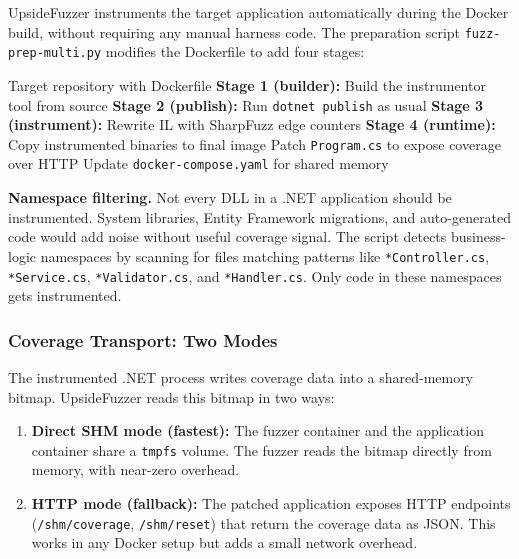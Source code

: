 \documentclass[conference]{IEEEtran}
\begin{document}
UpsideFuzzer instruments the target application automatically during the Docker build, without requiring any manual harness code. The preparation script \texttt{fuzz-prep-multi.py} modifies the Dockerfile to add four stages:

\begin{algorithm}[t]
\caption{Automated Instrumentation Pipeline}
\label{alg:instrument}
\begin{algorithmic}[1]
\REQUIRE Target repository with Dockerfile
\STATE \textbf{Stage 1 (builder):} Build the instrumentor tool from source
\STATE \textbf{Stage 2 (publish):} Run \texttt{dotnet publish} as usual
\STATE \textbf{Stage 3 (instrument):}
        \STATE Rewrite IL with SharpFuzz edge counters
    \ENDIF
\ENDFOR
\STATE \textbf{Stage 4 (runtime):} Copy instrumented binaries to final image
\STATE Patch \texttt{Program.cs} to expose coverage over HTTP
\STATE Update \texttt{docker-compose.yaml} for shared memory
\end{algorithmic}
\end{algorithm}

\textbf{Namespace filtering.} Not every DLL in a .NET application should be instrumented. System libraries, Entity Framework migrations, and auto-generated code would add noise without useful coverage signal. The script detects business-logic namespaces by scanning for files matching patterns like \texttt{*Controller.cs}, \texttt{*Service.cs}, \texttt{*Validator.cs}, and \texttt{*Handler.cs}. Only code in these namespaces gets instrumented.

\subsubsection{Coverage Transport: Two Modes}

The instrumented .NET process writes coverage data into a shared-memory bitmap. UpsideFuzzer reads this bitmap in two ways:

\begin{enumerate}
    \item \textbf{Direct SHM mode (fastest):} The fuzzer container and the application container share a \texttt{tmpfs} volume. The fuzzer reads the bitmap directly from memory, with near-zero overhead.
    \item \textbf{HTTP mode (fallback):} The patched application exposes HTTP endpoints (\texttt{/shm/coverage}, \texttt{/shm/reset}) that return the coverage data as JSON. This works in any Docker setup but adds a small network overhead.
\end{enumerate}
\end{document}
